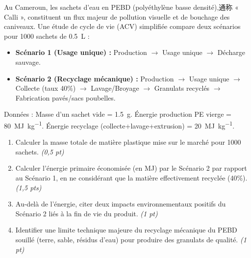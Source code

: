 \documentclass[11pt]{article}
\begin{document}
\begin{exercice}
Au Cameroun, les sachets d'eau en PEBD (polyéthylène basse densité),通称 « Calli », constituent un flux majeur de pollution visuelle et de bouchage des caniveaux. Une étude de cycle de vie (ACV) simplifiée compare deux scénarios pour 1000 sachets de \SI{0,5}{L} :
\begin{itemize}
    \item \textbf{Scénario 1 (Usage unique) :} Production $\rightarrow$ Usage unique $\rightarrow$ Décharge sauvage.
    \item \textbf{Scénario 2 (Recyclage mécanique) :} Production $\rightarrow$ Usage unique $\rightarrow$ Collecte (taux 40\%) $\rightarrow$ Lavage/Broyage $\rightarrow$ Granulats recyclés $\rightarrow$ Fabrication pavés/sacs poubelles.
\end{itemize}
Données : Masse d'un sachet vide = \SI{1,5}{g}. Énergie production PE vierge = \SI{80}{MJ.kg^{-1}}. Énergie recyclage (collecte+lavage+extrusion) = \SI{20}{MJ.kg^{-1}}.
\begin{enumerate}
    \item Calculer la masse totale de matière plastique mise sur le marché pour 1000 sachets. \textit{(0,5 pt)}
    \item Calculer l'énergie primaire économisée (en MJ) par le Scénario 2 par rapport au Scénario 1, en ne considérant que la matière effectivement recyclée (40\%). \textit{(1,5 pts)}
    \item Au-delà de l'énergie, citer deux impacts environnementaux positifs du Scénario 2 liés à la fin de vie du produit. \textit{(1 pt)}
    \item Identifier une limite technique majeure du recyclage mécanique du PEBD souillé (terre, sable, résidus d'eau) pour produire des granulats de qualité. \textit{(1 pt)}
\end{enumerate}
\end{exercice}
\end{document}

